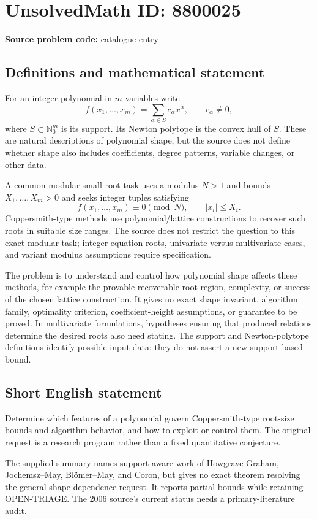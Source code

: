 \documentclass[11pt]{article}
\newcommand{\N}{\mathbb{N}}
\begin{document}
\section*{UnsolvedMath ID: 8800025}
\textbf{Source problem code:} catalogue entry
\subsection{Definitions and mathematical statement}
For an integer polynomial in $m$ variables write
\[
 f(x_1,\ldots,x_m)=\sum_{\alpha\in S}c_\alpha x^\alpha,
 \qquad c_\alpha\ne0,
\]
where $S\subset\N_0^m$ is its support. Its Newton polytope is the convex hull of $S$. These are natural descriptions of polynomial shape, but the source does not define whether shape also includes coefficients, degree patterns, variable changes, or other data.

A common modular small-root task uses a modulus $N>1$ and bounds $X_1,\ldots,X_m>0$ and seeks integer tuples satisfying
\[
 f(x_1,\ldots,x_m)\equiv0\pmod N,
 \qquad |x_i|\le X_i.
\]
Coppersmith-type methods use polynomial/lattice constructions to recover such roots in suitable size ranges. The source does not restrict the question to this exact modular task; integer-equation roots, univariate versus multivariate cases, and variant modulus assumptions require specification.

The problem is to understand and control how polynomial shape affects these methods, for example the provable recoverable root region, complexity, or success of the chosen lattice construction. It gives no exact shape invariant, algorithm family, optimality criterion, coefficient-height assumptions, or guarantee to be proved. In multivariate formulations, hypotheses ensuring that produced relations determine the desired roots also need stating. The support and Newton-polytope definitions identify possible input data; they do not assert a new support-based bound.
\subsection{Short English statement}
Determine which features of a polynomial govern Coppersmith-type root-size bounds and algorithm behavior, and how to exploit or control them. The original request is a research program rather than a fixed quantitative conjecture.

The supplied summary names support-aware work of Howgrave-Graham, Jochemsz--May, Blömer--May, and Coron, but gives no exact theorem resolving the general shape-dependence request. It reports partial bounds while retaining OPEN-TRIAGE. The 2006 source's current status needs a primary-literature audit.
\end{document}
